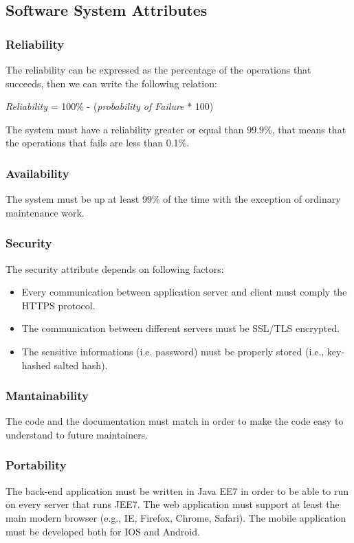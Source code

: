\documentclass{article}
\begin{document}
	
	\subsection{Software System Attributes}
	
	
	\subsubsection{Reliability}
	The reliability can be expressed as the percentage of the operations that succeeds, then we can write the following relation:
	
	\bigskip
	\begin{center}
		\textit{Reliability}  = 100\% - (\textit{probability of Failure} * 100)
	\end{center}

	\bigskip
	The system must have a reliability greater or equal than 99.9\%, that means that the operations that fails are less than 0.1\%.

	
	\subsubsection{Availability}
	The system must be up at least 99\% of the time with the exception of ordinary maintenance work.
	
	
	\subsubsection{Security}
	The security attribute depends on following factors:
	\begin{itemize}
		\item Every communication between application server and client must comply the  HTTPS protocol.
		\item The communication between different servers must be SSL/TLS encrypted.
		\item The sensitive informations (i.e. password) must be properly stored (i.e., key-hashed salted hash).
	\end{itemize}
	
	
	\subsubsection{Mantainability}
	The code and the documentation must match in order to make the code easy to understand to future maintainers.
	
	
	\subsubsection{Portability}
	The back-end application must be written in Java EE7 in order to be able to run on every server that runs JEE7. The web application must support at least the main modern browser (e.g., IE, Firefox, Chrome, Safari). The mobile application must be developed both for IOS and Android.
	
\end{document}
